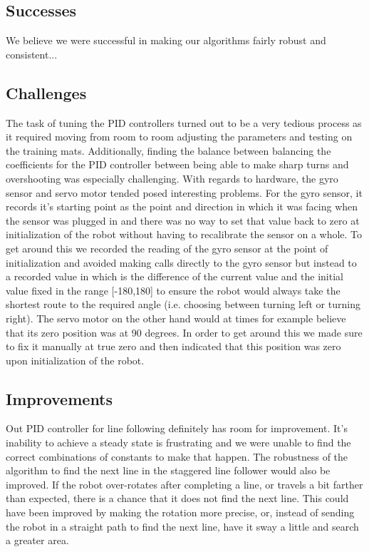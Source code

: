\documentclass[12pt]{article}
\begin{document}
\subsection{Successes}

We believe we were successful in making our algorithms fairly robust and consistent...

\subsection{Challenges}

The task of tuning the PID controllers turned out to be a very tedious process as it required moving from room to room adjusting the parameters and testing on the training mats. Additionally, finding the balance between balancing the coefficients for the PID controller between being able to make sharp turns and overshooting was especially challenging. With regards to hardware, the gyro sensor and servo motor tended posed interesting problems. For the gyro sensor, it records it's starting point as the point and direction in which it was facing when the sensor was plugged in and there was no way to set that value back to zero at initialization of the robot without having to recalibrate the sensor on a whole. To get around this we recorded the reading of the gyro sensor at the point of initialization and avoided making calls directly to the gyro sensor but instead to a recorded value in which is the difference of the current value and the initial value fixed in the range [-180,180] to ensure the robot would always take the shortest route to the required angle (i.e. choosing between turning left or turning right). The servo motor on the other hand would at times for example believe that its zero position was at 90 degrees. In order to get around this we made sure to fix it manually at true zero and then indicated that this position was zero upon initialization of the robot.

\subsection{Improvements}

Out PID controller for line following definitely has room for improvement. It's inability to achieve a steady state is frustrating and we were unable to find the correct combinations of constants to make that happen. The robustness of the algorithm to find the next line in the staggered line follower would also be improved. If the robot over-rotates after completing a line, or travels a bit farther than expected, there is a chance that it does not find the next line. This could have been improved by making the rotation more precise, or, instead of sending the robot in a straight path to find the next line, have it sway a little and search a greater area.
\end{document}
